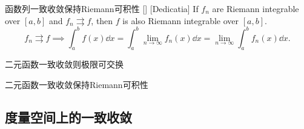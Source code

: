 \documentclass[UTF8]{ctexart}
\begin{document}
            \begin{ppt}
                {函数列一致收敛保持Riemann可积性}
                []
                [Dedicatia]
                If $f_n$ are Riemann integrable over $[a,b]$ and $f_n\rightrightarrows f$, then $f$ is also Riemann integrable over $[a,b]$.
                \[f_n\rightrightarrows f\implies \int_a^b f(x)\dd{x}=\int_a^b\lim_{n\to\infty}f_n(x)\dd{x}=\lim_{n\to\infty}\int_a^b f_n(x)\dd{x}. \]
            \end{ppt}

            \begin{ppt}
                {二元函数一致收敛则极限可交换}
            \end{ppt}
            \begin{ppt}
                {二元函数一致收敛保持Riemann可积性}
            \end{ppt}

        \subsection{度量空间上的一致收敛}
\end{document}
